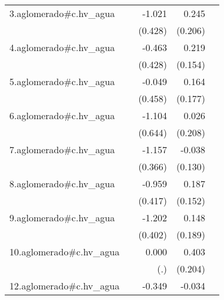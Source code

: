 {\begin{longtable}{l*{4}{D{.}{.}{-1}}}
\addlinespace
3.aglomerado#c.hv\_agua&                     &      -1.021\sym{*}  &       0.245         &                     \\
            &                     &     (0.428)         &     (0.206)         &                     \\
\addlinespace
4.aglomerado#c.hv\_agua&                     &      -0.463         &       0.219         &                     \\
            &                     &     (0.428)         &     (0.154)         &                     \\
\addlinespace
5.aglomerado#c.hv\_agua&                     &      -0.049         &       0.164         &                     \\
            &                     &     (0.458)         &     (0.177)         &                     \\
\addlinespace
6.aglomerado#c.hv\_agua&                     &      -1.104         &       0.026         &                     \\
            &                     &     (0.644)         &     (0.208)         &                     \\
\addlinespace
7.aglomerado#c.hv\_agua&                     &      -1.157\sym{**} &      -0.038         &                     \\
            &                     &     (0.366)         &     (0.130)         &                     \\
\addlinespace
8.aglomerado#c.hv\_agua&                     &      -0.959\sym{*}  &       0.187         &                     \\
            &                     &     (0.417)         &     (0.152)         &                     \\
\addlinespace
9.aglomerado#c.hv\_agua&                     &      -1.202\sym{**} &       0.148         &                     \\
            &                     &     (0.402)         &     (0.189)         &                     \\
\addlinespace
10.aglomerado#c.hv\_agua&                     &       0.000         &       0.403\sym{*}  &                     \\
            &                     &         (.)         &     (0.204)         &                     \\
\addlinespace
12.aglomerado#c.hv\_agua&                     &      -0.349         &      -0.034         &                     \\

\end{longtable}}
